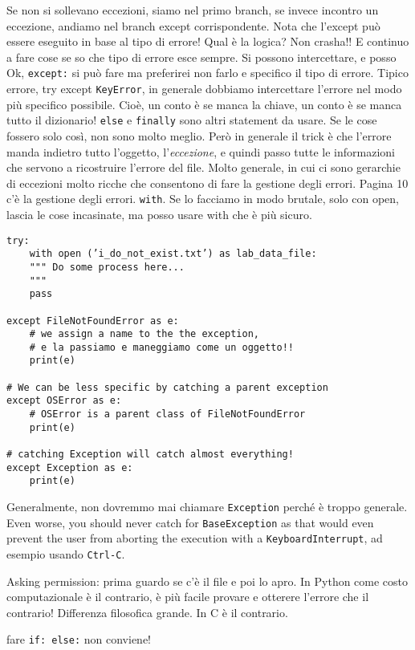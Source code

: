 \documentclass[10pt, a4paper, titlepage]{book}
\begin{document}
Se non si sollevano eccezioni, siamo nel primo branch, se invece incontro un eccezione, andiamo nel branch except corrispondente. 
Nota che l'except può essere eseguito in base al tipo di errore!
Qual è la logica? Non crasha!! E continuo a fare cose se so che tipo di errore esce sempre.
Si possono intercettare, e posso
Ok, \texttt{except:} si può fare ma preferirei non farlo e specifico il tipo di errore.
Tipico errore, try except \texttt{KeyError}, in generale dobbiamo intercettare l'errore nel modo più specifico possibile.
Cioè, un conto è se manca la chiave, un conto è se manca tutto il dizionario!
\texttt{else} e \texttt{finally} sono altri statement da usare.
Se le cose fossero solo così, non sono molto meglio. Però in generale il trick è che l'errore manda indietro tutto l'oggetto, l'\textit{eccezione}, e quindi passo tutte le informazioni che servono a ricostruire l'errore del file.
Molto generale, in cui ci sono gerarchie di eccezioni molto ricche che consentono di fare la gestione degli errori.
Pagina 10 c'è la gestione degli errori.
\texttt{with}. Se lo facciamo in modo brutale, solo con open, lascia le cose incasinate, ma posso usare with che è più sicuro.

\begin{verbatim}
try:
	with open (’i_do_not_exist.txt’) as lab_data_file:
	""" Do some process here...
	"""
	pass

except FileNotFoundError as e: 
	# we assign a name to the the exception, 
	# e la passiamo e maneggiamo come un oggetto!!
	print(e)

# We can be less specific by catching a parent exception
except OSError as e:
	# OSError is a parent class of FileNotFoundError
	print(e)

# catching Exception will catch almost everything!
except Exception as e:
	print(e)
\end{verbatim}

Generalmente, non dovremmo mai chiamare \texttt{Exception} perché è troppo generale.
Even worse, you should never catch for \texttt{BaseException} 
as that would even prevent the user from aborting the execution with a \texttt{KeyboardInterrupt}, ad esempio usando \texttt{Ctrl-C}.

Asking permission: prima guardo se c'è il file e poi lo apro. In Python come costo computazionale è il contrario, è più facile provare e otterere l'errore che il contrario! Differenza filosofica grande. In C è il contrario.

fare \texttt{if: else:} non conviene!
\end{document}
